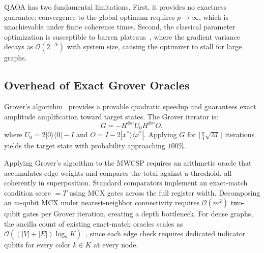 \documentclass{ieeeaccess}
\begin{document}
QAOA has two fundamental limitations. First, it provides no
exactness guarantee: convergence to the global optimum requires
$p \to \infty$, which is unachievable under finite coherence times.
Second, the classical parameter optimization is susceptible to barren
plateaus~\cite{mcclean2018barren}, where the gradient variance decays
as $\mathcal{O}(2^{-N})$ with system size, causing the optimizer to
stall for large graphs.

\subsection{Overhead of Exact Grover Oracles}

Grover's algorithm~\cite{grover1996, brassard2002} provides a
provable quadratic speedup and guarantees exact amplitude
amplification toward target states. The Grover iterator is:
%
\begin{equation}
G = -H^{\otimes n} U_0 H^{\otimes n} O,
\end{equation}
%
where $U_0 = 2|0\rangle\langle 0| - I$ and
$O = I - 2|x^*\rangle\langle x^*|$.
Applying $G$ for $\lfloor\frac{\pi}{4}\sqrt{M}\rfloor$ iterations
yields the target state with probability approaching $100\%$.

Applying Grover's algorithm to the MWCSP requires an arithmetic oracle
that accumulates edge weights and compares the total against a
threshold, all coherently in superposition. Standard comparators
implement an exact-match condition score $= T$ using MCX gates across
the full register width. Decomposing an $m$-qubit MCX under
nearest-neighbor connectivity requires $\mathcal{O}(m^2)$ two-qubit
gates per Grover iteration, creating a depth bottleneck. For dense
graphs, the ancilla count of existing exact-match oracles scales as
$\mathcal{O}((|V|+|E|)\log_2 K)$~\cite{belletti2025, glos2022,
clerc2023}, since each edge check requires dedicated indicator qubits
for every color $k \in K$ at every node.
\end{document}
